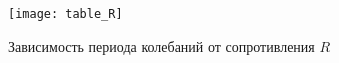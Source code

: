 
\pagestyle{fancy} 
\fancyhead{} 
\fancyhead[R]{} 
\fancyhead[L]{} 

\fancyfoot{} 
\fancyfoot[C]{\thepage} 



\begin{figure}[H]
	\centering
	\texttt{[image: table\_R]}
	\caption{Зависимость периода колебаний от сопротивления $R$}
	\label{fig:figr}
\end{figure}



